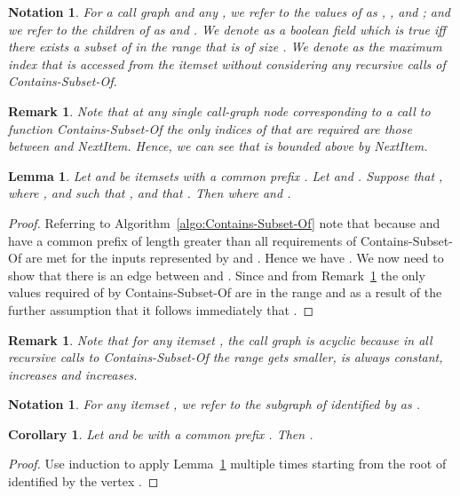\documentclass[13pt,a4paper]{article}
\newtheorem{lemma}[theorem]{Lemma}
\newtheorem{corollary}[theorem]{Corollary}
\newtheorem{notation}[theorem]{Notation}
\newtheorem{remark}[theorem]{Remark}
\begin{document}
\begin{notation}
For a call graph  and any , we refer to the values of  as , ,  and ; and we refer to the children of  as  and . We denote  as a boolean field which is true iff there exists a subset of  in the range  that is of size . We denote  as the maximum index that is accessed from the itemset  without considering any recursive calls of Contains-Subset-Of.
\end{notation}

\begin{remark}
\label{MartinRemark}
Note that at any \textit{single} call-graph node corresponding to a call to function Contains-Subset-Of the only indices of  that are required are those between  and NextItem. Hence, we can see that  is bounded above by NextItem.
\end{remark}

\begin{lemma}
\label{MartinLemma}
Let  and  be itemsets with a common prefix . Let  and . 
Suppose that , where , and  such that , and that . 
Then  where  and  .
\end{lemma}

\begin{proof}
Referring to Algorithm~\ref{algo:Contains-Subset-Of} note that because  and  have a common prefix  of length greater than  all requirements of Contains-Subset-Of are met for the inputs represented by  and . Hence we have . We now need to show that there is an edge between  and . Since  and from Remark~\ref{MartinRemark} the only values required of  by Contains-Subset-Of are in the range  and as a result of the further assumption that  it follows immediately that .
\end{proof}

\begin{remark}
Note that for any itemset , the call graph  is acyclic because in all recursive calls to Contains-Subset-Of the range  gets smaller,  is always constant,  increases and  increases. 
\end{remark}

\begin{notation}
For any itemset , we refer to the subgraph of  identified by  as .
\end{notation}

\begin{corollary}
\label{MartinCorollary}
Let  and  be  with a common prefix .
Then .
\end{corollary}

\begin{proof}
Use induction to apply Lemma~\ref{MartinLemma} multiple times starting from the root of  identified by the vertex .
\end{proof}
\end{document}
